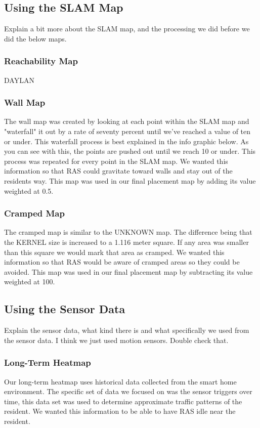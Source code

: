 \documentclass[11pt, draft, a4paper]{IEEEtran}
\begin{document}
\subsection{Using the SLAM Map}
Explain a bit more about the SLAM map, and the processing we did before we did the below maps.


\subsubsection{Reachability Map}
DAYLAN


\subsubsection{Wall Map}
The wall map was created by looking at each point within the SLAM map and "waterfall" it out by a rate of seventy percent until we've reached a value of ten or under. This waterfall process is best explained in the info graphic below. As you can see with this, the points are pushed out until we reach 10 or under. This process was repeated for every point in the SLAM map. We wanted this information so that RAS could gravitate toward walls and stay out of the residents way. 
This map was used in our final placement map by adding its value weighted at 0.5.


\subsubsection{Cramped Map}
The cramped map is similar to the UNKNOWN map. The difference being that the KERNEL size is increased to a 1.116 meter square. If any area was smaller than this square we would mark that area as cramped. We wanted this information so that RAS would be aware of cramped areas so they could be avoided. 
This map was used in our final placement map by subtracting its value weighted at 100.


\subsection{Using the Sensor Data}
Explain the sensor data, what kind there is and what specifically we used from the sensor data. I think we just used motion sensors. Double check that. 


\subsubsection{Long-Term Heatmap}
Our long-term heatmap uses historical data collected from the smart home environment. The specific set of data we focused on was the sensor triggers over time, this data set was used to determine approximate traffic patterns of the resident. We wanted this information to be able to have RAS idle near the resident.
\end{document}
